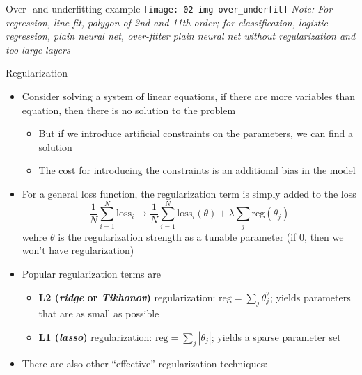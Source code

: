    \begin{frame}{Over- and underfitting example}
      \texttt{[image: 02-img-over\_underfit]}
      \enlargethispage{3em}
      \emph{\footnotesize Note: For regression, line fit, polygon of 2nd and 11th order; for classification, logistic regression, plain neural net, over-fitter plain neural net without regularization and too large layers}
    \end{frame}

    \begin{frame}{Regularization}
      \begin{itemize}
        \item Consider solving a system of linear equations, if there are more variables than equation, then there is no solution to the problem
        \begin{itemize}
          \item But if we introduce artificial constraints on the parameters, we can find a solution
          \item The cost for introducing the constraints is an additional bias in the model
        \end{itemize}
        \item For a general loss function, the regularization term is simply added to the loss
          \begin{equation*}
            \frac{1}{N}\sum_{i=1}^N \mathrm{loss}_i \rightarrow
            \frac{1}{N}\sum_{i=1}^N \mathrm{loss}_i(\theta)
              + \lambda \sum_j\mathrm{reg}(\theta_j)
          \end{equation*}
          wehre $\theta$ is the regularization strength as a tunable parameter (if $0$, then we won't have regularization)
        \item Popular regularization terms are
        \begin{itemize}
          \item \textbf{L2 (\emph{ridge} or \emph{Tikhonov})} regularization: $\mathrm{reg} = \sum_j \theta_j^2$; yields parameters that are as small as possible
          \item \textbf{L1 (\emph{lasso})} regularization: $\mathrm{reg} = \sum_j\left|\theta_j\right|$; yields a sparse parameter set
        \end{itemize}
        \item There are also other \enquote{effective} regularization techniques:  %

\end{itemize}
\end{frame}
